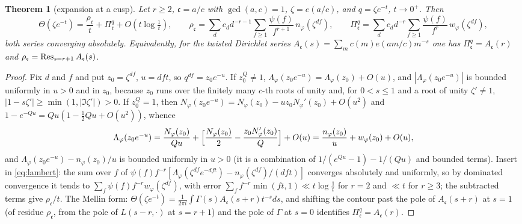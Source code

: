 \documentclass[11pt]{amsart}
\newtheorem{theorem}{Theorem}[section]
\theoremstyle{definition}
\theoremstyle{remark}
\newcommand{\cc}{\mathfrak c}\newcommand{\Pc}{\Pi_{\cc}}\newcommand{\Pq}{\Pi^{q}}
\begin{document}
\begin{theorem}[expansion at a cusp]\label{thm:expansion}
Let $r\ge2$, $\cc=a/c$ with $\gcd(a,c)=1$, $\zeta=e(a/c)$, and $q=\zeta e^{-t}$, $t\to0^+$. Then
\begin{equation}\label{eq:expansion}
\Theta(\zeta e^{-t})=\frac{\rho_{\cc}}t+\Pq_{\cc}+O(t\log\tfrac1t),\qquad
\rho_{\cc}=\sum_dc_dd^{-r-1}\sum_{f\ge1}\frac{\psi(f)}{f^{r+1}}\,n_\varphi(\zeta^{df}),\qquad
\Pq_{\cc}=\sum_dc_dd^{-r}\sum_{f\ge1}\frac{\psi(f)}{f^{r}}\,w_\varphi(\zeta^{df}),
\end{equation}
both series converging absolutely. Equivalently, for the twisted Dirichlet series $A_{\cc}(s)=\sum_mc(m)e(am/c)m^{-s}$ one has $\Pq_{\cc}=A_{\cc}(r)$ and $\rho_{\cc}=\Res_{s=r+1}A_{\cc}(s)$.
\end{theorem}
\begin{proof}
Fix $d$ and $f$ and put $z_0=\zeta^{df}$, $u=dft$, so $q^{df}=z_0e^{-u}$. If $z_0^Q\ne1$, $\Lambda_\varphi(z_0e^{-u})=\Lambda_\varphi(z_0)+O(u)$, and $|\Lambda_\varphi(z_0e^{-u})|$ is bounded uniformly in $u>0$ and in $z_0$, because $z_0$ runs over the finitely many $c$-th roots of unity and, for $0<s\le1$ and a root of unity $\zeta'\ne1$, $|1-s\zeta'|\ge\min(1,|\Im\zeta'|)>0$. If $z_0^Q=1$, then $N_\varphi(z_0e^{-u})=N_\varphi(z_0)-uz_0N_\varphi'(z_0)+O(u^2)$ and $1-e^{-Qu}=Qu(1-\tfrac12Qu+O(u^2))$, whence
$$\Lambda_\varphi(z_0e^{-u})=\frac{N_\varphi(z_0)}{Qu}+\Bigl[\frac{N_\varphi(z_0)}2-\frac{z_0N'_\varphi(z_0)}Q\Bigr]+O(u)=\frac{n_\varphi(z_0)}u+w_\varphi(z_0)+O(u),$$
and $\Lambda_\varphi(z_0e^{-u})-n_\varphi(z_0)/u$ is bounded uniformly in $u>0$ (it is a combination of $1/(e^{Qu}-1)-1/(Qu)$ and bounded terms). Insert in \eqref{eq:lambert}: the sum over $f$ of $\psi(f)f^{-r}[\Lambda_\varphi(\zeta^{df}e^{-dft})-n_\varphi(\zeta^{df})/(dft)]$ converges absolutely and uniformly, so by dominated convergence it tends to $\sum_f\psi(f)f^{-r}w_\varphi(\zeta^{df})$, with error $\sum_ff^{-r}\min(ft,1)\ll t\log\frac1t$ for $r=2$ and $\ll t$ for $r\ge3$; the subtracted terms give $\rho_{\cc}/t$. The Mellin form: $\Theta(\zeta e^{-t})=\frac1{2\pi i}\int\Gamma(s)A_{\cc}(s+r)t^{-s}ds$, and shifting the contour past the pole of $A_{\cc}(s+r)$ at $s=1$ (of residue $\rho_{\cc}$, from the pole of $L(s-r,\cdot)$ at $s=r+1$) and the pole of $\Gamma$ at $s=0$ identifies $\Pq_{\cc}=A_{\cc}(r)$.
\end{proof}
\end{document}
